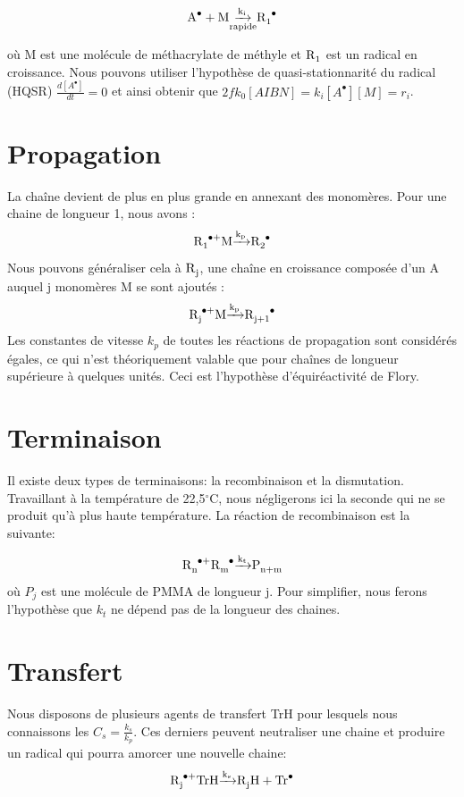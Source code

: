 \documentclass[a4paper,oneside,12pt]{article}
\begin{document}
\begin{equation}
\ce{A^{\bullet} + M \underset{rapide}{\xrightarrow{k_i}} R1^\bullet}
\label{2}
\end{equation}

où M est une molécule de méthacrylate de méthyle et $\ce{R_1}$ est un radical en croissance. Nous pouvons utiliser l'hypothèse de quasi-stationnarité du radical (HQSR) $\frac{d[A^{\bullet}]}{dt}=0$ et ainsi obtenir que $2fk_{0}[AIBN]=k_{i}[A^{\bullet}][M]=r_i$.

\section{Propagation}
La chaîne devient de plus en plus grande en annexant des monomères. Pour une chaine de longueur 1, nous avons :
\begin{equation}
\ce{R1^\bullet + M \xrightarrow{k_p} R2^\bullet}
\end{equation}
Nous pouvons généraliser cela à $\ce{R_j}$, une chaîne en croissance composée d'un A auquel j monomères M se sont ajoutés :
\begin{equation}
\ce{R_j^\bullet + M \xrightarrow{k_p} R_{j+1}^\bullet}
\end{equation}
Les constantes de vitesse $k_{p}$ de toutes les réactions de propagation sont considérés égales, ce qui n'est théoriquement valable que pour chaînes de longueur supérieure à quelques unités. Ceci est l'hypothèse d'équiréactivité de Flory.

\section{Terminaison}
Il existe deux types de terminaisons: la recombinaison et la dismutation. Travaillant à la température de 22,5$^{\circ}$C, nous négligerons ici la seconde qui ne se produit qu'à plus haute température. La réaction de recombinaison est la suivante:

\begin{equation}
\ce{R_{n}^\bullet + R_{m}^\bullet \xrightarrow{k_t} P_{n+m}}
\end{equation}
où $P_{j}$ est une molécule de PMMA de longueur j. Pour simplifier, nous ferons l'hypothèse que $k_{t}$ ne dépend pas de la longueur des chaines.

\section{Transfert}
Nous disposons de plusieurs agents de transfert TrH pour lesquels nous connaissons les $C_{s}=\frac{k_{s}}{k_{p}}$. Ces derniers peuvent neutraliser une chaine et produire un radical qui pourra amorcer une nouvelle chaine:
\begin{equation}
\ce{R_{j}^\bullet + TrH \xrightarrow{k_s} R_{j}H + Tr^{\bullet}}
\end{equation}
\end{document}
